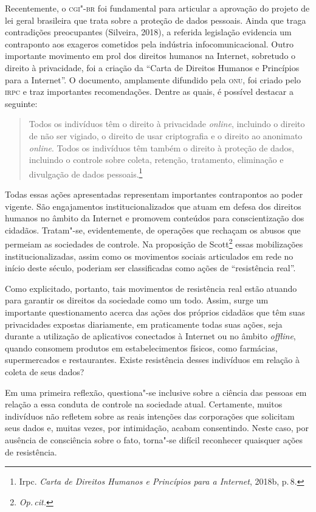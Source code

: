 Recentemente, o \textsc{cgi"-br} foi fundamental para articular a aprovação do
projeto de lei geral brasileira que trata sobre a proteção de dados
pessoais. Ainda que traga contradições preocupantes (Silveira, 2018), a
referida legislação evidencia um contraponto aos exageros cometidos pela
indústria infocomunicacional. Outro importante movimento em prol dos
direitos humanos na Internet, sobretudo o direito à privacidade, foi a
criação da ``Carta de Direitos Humanos e Princípios para a Internet''. O
documento, amplamente difundido pela \textsc{onu}, foi criado pelo \textsc{irpc} e traz
importantes recomendações. Dentre as quais, é possível destacar a
seguinte:

\begin{quote}
Todos os indivíduos têm o direito à privacidade \textit{online}, incluindo o
direito de não ser vigiado, o direito de usar criptografia e o direito
ao anonimato \textit{online}. Todos os indivíduos têm também o direito à proteção
de dados, incluindo o controle sobre coleta, retenção, tratamento,
eliminação e divulgação de dados pessoais.\footnote{Irpc. \textit{Carta de Direitos Humanos e Princípios para a Internet}, 2018b, p.\,8.}
\end{quote}

Todas essas ações apresentadas representam importantes contrapontos ao
poder vigente. São engajamentos institucionalizados que atuam em defesa
dos direitos humanos no âmbito da Internet e promovem conteúdos para
conscientização dos cidadãos. Tratam"-se, evidentemente, de operações que
rechaçam os abusos que permeiam as sociedades de controle. Na proposição
de Scott\footnote{\textit{Op.\,cit.}} essas mobilizações
institucionalizadas, assim como os movimentos sociais articulados em
rede no início deste século, poderiam ser classificadas como ações de
``resistência real''.

Como explicitado, portanto, tais movimentos de resistência real estão
atuando para garantir os direitos da sociedade como um todo. Assim,
surge um importante questionamento acerca das ações dos próprios
cidadãos que têm suas privacidades expostas diariamente, em praticamente
todas suas ações, seja durante a utilização de aplicativos conectados à
Internet ou no âmbito \textit{offline}, quando consomem produtos em
estabelecimentos físicos, como farmácias, supermercados e restaurantes.
Existe resistência desses indivíduos em relação à coleta de seus dados?

Em uma primeira reflexão, questiona"-se inclusive sobre a ciência das
pessoas em relação a essa conduta de controle na sociedade atual.
Certamente, muitos indivíduos não refletem sobre as reais intenções das
corporações que solicitam seus dados e, muitas vezes, por intimidação,
acabam consentindo. Neste caso, por ausência de consciência sobre o
fato, torna"-se difícil reconhecer quaisquer ações de resistência.

